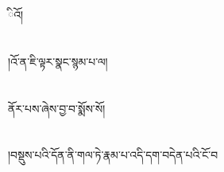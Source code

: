 ིའོ།\chapter{ }།འོ་ན་ཇི་ལྟར་སྣང་སྙམ་པ་ལ།\chapter{ }ནོར་པས་ཞེས་བྱ་བ་སྨོས་སོ།\chapter{ }།བསྡུས་པའི་དོན་ནི་གལ་ཏེ་རྣམ་པ་འདི་དག་བདེན་པའི་ངོ་བ